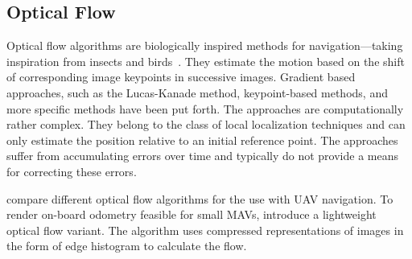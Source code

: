 
\subsection{Optical Flow}
\label{sec:opticalflow}

Optical flow algorithms are biologically inspired methods for navigation---taking inspiration from insects and birds~\cite{ruffier2003bio}. They estimate the motion based on the shift of corresponding image keypoints in successive images. Gradient based approaches, such as the Lucas-Kanade method, keypoint-based methods, and more specific methods have been put forth. The approaches are computationally rather complex. They belong to the class of local localization techniques and can only estimate the position relative to an initial reference point. The approaches suffer from accumulating errors over time and typically do not provide a means for correcting these errors.

\citet{chao2013survey} compare different optical flow algorithms for the use with UAV navigation. To render on-board odometry feasible for small MAVs, \citet{mcguire2016local} introduce a lightweight optical flow variant. The algorithm uses compressed representations of images in the form of edge histogram to calculate the flow.   
